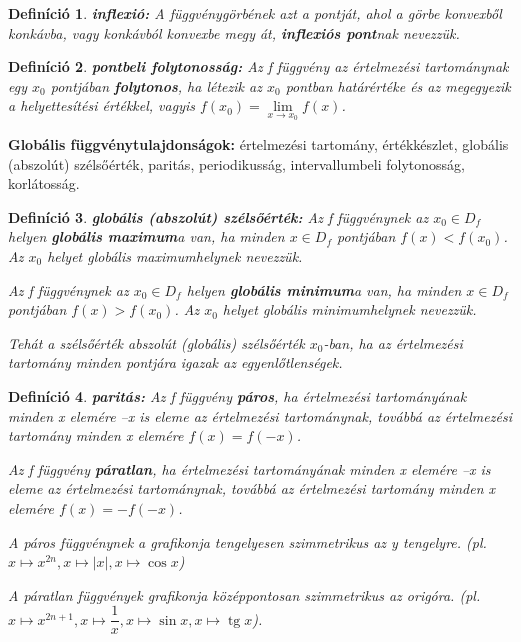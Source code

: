 \documentclass[12pt,a4paper]{article}
\newtheorem{definition}{Definíció} [section]
\DeclareMathOperator{\tg}{tg}
\begin{document}
\begin{definition}
\textbf{inflexió:} A függvénygörbének azt a pontját, ahol a görbe konvexből konkávba, vagy konkávból konvexbe megy át, \textbf{inflexiós pont}nak nevezzük.
\end{definition}

\begin{definition}
\textbf{pontbeli folytonosság:} Az f függvény az értelmezési tartománynak egy $x_0$ pontjában \textbf{folytonos}, ha létezik az $x_0$ pontban határértéke és az megegyezik a helyettesítési értékkel, vagyis $f(x_0)=\lim\limits_{x \rightarrow x_0} f(x)$.
\end{definition}

\textbf{Globális függvénytulajdonságok:} értelmezési tartomány, értékkészlet, globális (abszolút) szélsőérték, paritás, periodikusság, intervallumbeli folytonosság, korlátosság.

\begin{definition}
\textbf{globális (abszolút) szélsőérték:} Az f függvénynek az $x_0 \in D_f$ helyen \textbf{globális maximum}a van, ha minden $x \in D_f$ pontjában $f(x) < f(x_0)$. Az $x_0$ helyet globális maximumhelynek nevezzük.

Az f függvénynek az $x_0 \in D_f$ helyen \textbf{globális minimum}a van, ha minden $x \in D_f$ pontjában $f(x) > f(x_0)$. Az $x_0$ helyet globális minimumhelynek nevezzük.

Tehát a szélsőérték abszolút (globális) szélsőérték $x_0$-ban, ha az értelmezési tartomány minden pontjára igazak az egyenlőtlenségek.
\end{definition}

\begin{definition}
\textbf{paritás:} Az f függvény \textbf{páros}, ha értelmezési tartományának minden x elemére –x is eleme az értelmezési tartománynak, továbbá az értelmezési tartomány minden x elemére $f(x) = f(-x)$.

Az f függvény \textbf{páratlan}, ha értelmezési tartományának minden x elemére –x is eleme az értelmezési tartománynak, továbbá az értelmezési tartomány minden x elemére $f(x) = -f(-x)$.

A páros függvénynek a grafikonja tengelyesen szimmetrikus az y tengelyre. (pl. $x \mapsto x^{2n}, x \mapsto |x|, x \mapsto \cos x$)

A páratlan függvények grafikonja középpontosan szimmetrikus az origóra. (pl. $x \mapsto x ^{2n + 1}, x \mapsto \dfrac{1}{x} , x \mapsto \sin x, x \mapsto \tg x$).
\end{definition}
\end{document}
